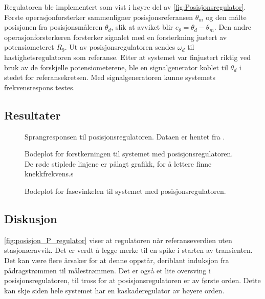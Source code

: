 Regulatoren ble implementert som vist i høyre del av \autoref{fig:Posisjonsregulator}. Første operasjonforsterker sammenligner posisjonsreferansen $\theta_m$ og den målte posisjonen fra posisjonsmåleren $\theta_d$, slik at avviket blir $e_{\theta} = \theta_d - \theta_m$. Den andre operasjonforsterkeren forsterker signalet med en forsterkning justert av potensiometeret $R_9$. Ut av posisjonsregulatoren sendes $\omega_d$ til hastighetsregulatoren som referanse.
Etter at systemet var finjustert riktig ved bruk av de forskjelle potensiometerene, ble en signalgenerator koblet til $\theta_d$ i stedet for referansekretsen. Med signalgeneratoren kunne systemets frekvensrespons testes.







\subsection{Resultater}

\begin{figure}[h]
    \centering
    
    \caption{Sprangresponsen til posisjonsregulatoren. Dataen er hentet fra \cite{EksempelData}.}
    \label{fig:posisjon_P_regulator}
\end{figure}

\begin{figure}[h]
    \centering
    
    \caption{Bodeplot for forstkerningen til systemet med posisjonsregulatoren. De røde stiplede linjene er pålagt grafikk, for å lettere finne knekkfrekvens.s}
    \label{fig:bodeplot}
\end{figure}

\begin{figure}[h]
    \centering
    
    \caption{Bodeplot for fasevinkelen til systemet med posisjonsregulatoren.}
    \label{fig:bodeplot_fase}
\end{figure}







\subsection{Diskusjon}

\autoref{fig:posisjon_P_regulator} viser at regulatoren når referanseverdien uten stasjonæravvik. Det er verdt å legge merke til en spike i starten av transienten. 
Det kan være flere årsaker for at denne oppstår, deriblant induksjon fra pådragstrømmen til målestrømmen. Det er også et lite oversving i posisjonsregulatoren, til tross for at posisjonsregulatoren er av første orden. Dette kan skje siden hele systemet har en kaskaderegulator av høyere orden.

